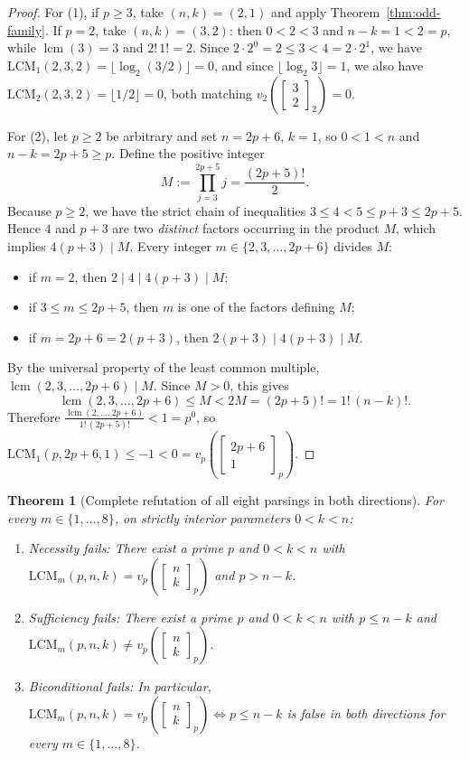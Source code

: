\documentclass[11pt,a4paper]{article}
\newtheorem{theorem}{Theorem}[section]
\theoremstyle{definition}
\theoremstyle{remark}
\newcommand{\qbinom}[3]{\begin{bmatrix} #1 \\ #2 \end{bmatrix}_{#3}}
\newcommand{\lcm}{\operatorname{lcm}}
\begin{document}
\begin{proof}
For (1), if $p \ge 3$, take $(n,k) = (2,1)$ and apply Theorem~\ref{thm:odd-family}.
If $p = 2$, take $(n,k) = (3,2)$: then $0 < 2 < 3$ and $n - k = 1 < 2 = p$, while
$\lcm(3) = 3$ and $2!\,1! = 2$. Since $2 \cdot 2^0 = 2 \le 3 < 4 = 2 \cdot 2^1$, we
have $\mathrm{LCM}_1(2,3,2) = \lfloor \log_2(3/2)\rfloor = 0$, and since
$\lfloor \log_2 3 \rfloor = 1$, we also have
$\mathrm{LCM}_2(2,3,2) = \lfloor 1/2 \rfloor = 0$, both matching
$v_2\!\left(\qbinom{3}{2}{2}\right) = 0$.

For (2), let $p \ge 2$ be arbitrary and set $n = 2p + 6$, $k = 1$, so $0 < 1 < n$
and $n - k = 2p + 5 \ge p$. Define the positive integer
\[
  M := \prod_{j=3}^{2p+5} j = \frac{(2p+5)!}{2}.
\]
Because $p \ge 2$, we have the strict chain of inequalities
$3 \le 4 < 5 \le p + 3 \le 2p + 5$. Hence $4$ and $p + 3$ are two \emph{distinct}
factors occurring in the product $M$, which implies $4(p+3) \mid M$. Every integer
$m \in \{2, 3, \dots, 2p+6\}$ divides $M$:
\begin{itemize}
  \item if $m = 2$, then $2 \mid 4 \mid 4(p+3) \mid M$;
  \item if $3 \le m \le 2p+5$, then $m$ is one of the factors defining $M$;
  \item if $m = 2p + 6 = 2(p+3)$, then $2(p+3) \mid 4(p+3) \mid M$.
\end{itemize}
By the universal property of the least common multiple,
$\lcm(2,3,\dots,2p+6) \mid M$. Since $M > 0$, this gives
\[
  \lcm(2,3,\dots,2p+6) \le M < 2M = (2p+5)! = 1!\,(n-k)!.
\]
Therefore $\frac{\lcm(2,\dots,2p+6)}{1!\,(2p+5)!} < 1 = p^0$, so
$\mathrm{LCM}_1(p,2p+6,1) \le -1 < 0 = v_p\!\left(\qbinom{2p+6}{1}{p}\right)$.
\end{proof}

\begin{theorem}[Complete refutation of all eight parsings in both directions]
\label{thm:all-eight}
For every $m \in \{1,\dots,8\}$, on strictly interior parameters $0 < k < n$:
\begin{enumerate}
  \item \emph{Necessity fails:} There exist a prime $p$ and $0 < k < n$ with
    $\mathrm{LCM}_m(p,n,k) = v_p\!\left(\qbinom{n}{k}{p}\right)$ and $p > n - k$.
  \item \emph{Sufficiency fails:} There exist a prime $p$ and $0 < k < n$ with
    $p \le n - k$ and $\mathrm{LCM}_m(p,n,k) \neq v_p\!\left(\qbinom{n}{k}{p}\right)$.
  \item \emph{Biconditional fails:} In particular,
    $\mathrm{LCM}_m(p,n,k) = v_p\!\left(\qbinom{n}{k}{p}\right) \iff p \le n - k$
    is false in both directions for every $m \in \{1,\dots,8\}$.
\end{enumerate}
\end{theorem}
\end{document}
